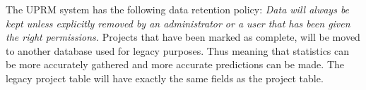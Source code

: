 		The UPRM system has the following data retention policy: \emph{Data will always be kept unless explicitly removed by an administrator or a user that has been given the right permissions.}
		Projects that have been marked as complete, will be moved to another database used for legacy purposes. Thus meaning that statistics can be more accurately gathered and more accurate predictions can be made.
		The legacy project table will have exactly the same fields as the project table.